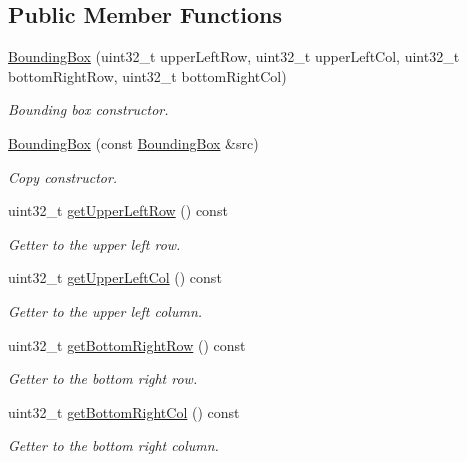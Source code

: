 \subsection*{Public Member Functions}
\begin{DoxyCompactItemize}
\item 
\hyperlink{classfc_1_1BoundingBox_a521a34a72d4e4786d4c5e910b7334407}{Bounding\+Box} (uint32\+\_\+t upper\+Left\+Row, uint32\+\_\+t upper\+Left\+Col, uint32\+\_\+t bottom\+Right\+Row, uint32\+\_\+t bottom\+Right\+Col)
\begin{DoxyCompactList}\small\item\em Bounding box constructor. \end{DoxyCompactList}\item 
\hyperlink{classfc_1_1BoundingBox_aeb427ee69514165e4d4357a007c963c1}{Bounding\+Box} (const \hyperlink{classfc_1_1BoundingBox}{Bounding\+Box} \&src)
\begin{DoxyCompactList}\small\item\em Copy constructor. \end{DoxyCompactList}\item 
uint32\+\_\+t \hyperlink{classfc_1_1BoundingBox_a921418d145cc148a50d599b51447215a}{get\+Upper\+Left\+Row} () const
\begin{DoxyCompactList}\small\item\em Getter to the upper left row. \end{DoxyCompactList}\item 
uint32\+\_\+t \hyperlink{classfc_1_1BoundingBox_a21e8dcad0b3d37aa0a37c6dab4200974}{get\+Upper\+Left\+Col} () const
\begin{DoxyCompactList}\small\item\em Getter to the upper left column. \end{DoxyCompactList}\item 
uint32\+\_\+t \hyperlink{classfc_1_1BoundingBox_a74411180845c0572329c693170621245}{get\+Bottom\+Right\+Row} () const
\begin{DoxyCompactList}\small\item\em Getter to the bottom right row. \end{DoxyCompactList}\item 
uint32\+\_\+t \hyperlink{classfc_1_1BoundingBox_aedfb5b832d699a78a954c6778208414c}{get\+Bottom\+Right\+Col} () const
\begin{DoxyCompactList}\small\item\em Getter to the bottom right column. \end{DoxyCompactList}\item 

\end{DoxyCompactItemize}
